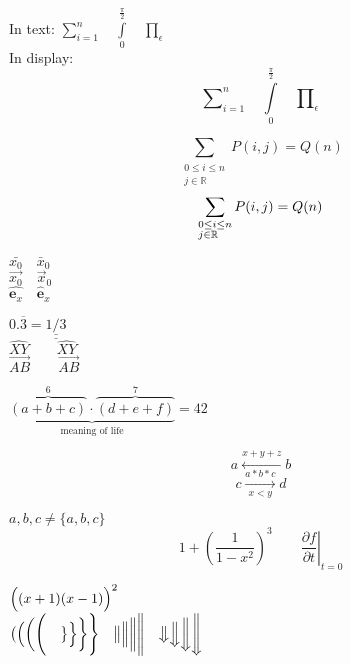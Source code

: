 \documentclass[12pt]{ctexrep}
\begin{document}
In text:
$\sum\limits_{i=1}^n \quad 
\int\limits_0^{\frac{\pi}{2}} \quad 
\prod\limits_\epsilon $ \\
In display:
\[
\sum\nolimits_{i=1}^n \quad 
\int\limits_0^{\frac{\pi}{2}} \quad 
\prod\nolimits_\epsilon     
\]

\[
\sum_{\substack{0\le i\le n \\ j\in \mathbb{R}}} P(i,j) = Q(n)    
\]
\[
\sum_{\begin{subarray}{l}
    0\le i\le n \\
    j\in \mathbb{R}
\end{subarray}}
P(i,j) = Q(n)    
\]

$\bar{x_0} \quad \bar{x}_0$\\[5pt]
$\vec{x_0} \quad \vec{x}_0$\\[5pt]
$\hat{\mathbf{e}_x} \quad \hat{\mathbf{e}}_x$

$0.\overline{3} = \underline{\underline{1/3}}$\\[5pt]
$\hat{XY} \qquad \widehat{XY}$\\[5pt]
$\vec{AB} \qquad \overrightarrow{AB}$

$\underbrace{\overbrace{(a+b+c)}^6 
\cdot \overbrace{(d+e+f)}^7}
_\text{meaning of life} = 42$

\[
a\xleftarrow{x+y+z} b     
\]
\[
c\xrightarrow[x<y]{a*b*c}d    
\]

${a,b,c} \neq \{a,b,c\}$
\[
1 + \left(\frac{1}{1-x^{2}}
\right)^3 \qquad
\left.\frac{\partial f}{\partial t}
\right|_{t=0}    
\]

$\Bigl((x+1)(x-1)\Bigr)^{2}$\\
$\bigl( \Bigl( \biggl( \Biggl( \quad 
\bigr\} \Bigr\} \biggr\} \Biggr\} \quad 
\big\| \Big\| \bigg\| \Bigg\| \quad 
\big\Downarrow \Big\Downarrow 
\bigg\Downarrow \Bigg\Downarrow$
\end{document}
